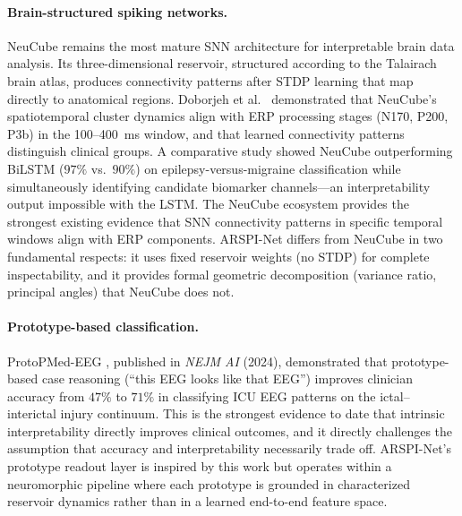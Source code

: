 \paragraph{Brain-structured spiking networks.} NeuCube \cite{kasabov_neucube_2014} remains the most mature SNN architecture for interpretable brain data analysis. Its three-dimensional reservoir, structured according to the Talairach brain atlas, produces connectivity patterns after STDP learning that map directly to anatomical regions. Doborjeh et al.\ \cite{doborjeh_explainable_2021} demonstrated that NeuCube's spatiotemporal cluster dynamics align with ERP processing stages (N170, P200, P3b) in the 100--400~ms window, and that learned connectivity patterns distinguish clinical groups. A comparative study \cite{doborjeh_epilepsy_2024} showed NeuCube outperforming BiLSTM ($97\%$ vs.\ $90\%$) on epilepsy-versus-migraine classification while simultaneously identifying candidate biomarker channels---an interpretability output impossible with the LSTM. The NeuCube ecosystem provides the strongest existing evidence that SNN connectivity patterns in specific temporal windows align with ERP components. ARSPI-Net differs from NeuCube in two fundamental respects: it uses fixed reservoir weights (no STDP) for complete inspectability, and it provides formal geometric decomposition (variance ratio, principal angles) that NeuCube does not.

\paragraph{Prototype-based classification.} ProtoPMed-EEG \cite{barnett_protopmed_2024}, published in \emph{NEJM AI} (2024), demonstrated that prototype-based case reasoning (``this EEG looks like that EEG'') improves clinician accuracy from $47\%$ to $71\%$ in classifying ICU EEG patterns on the ictal--interictal injury continuum. This is the strongest evidence to date that intrinsic interpretability directly improves clinical outcomes, and it directly challenges the assumption that accuracy and interpretability necessarily trade off. ARSPI-Net's prototype readout layer is inspired by this work but operates within a neuromorphic pipeline where each prototype is grounded in characterized reservoir dynamics rather than in a learned end-to-end feature space.

